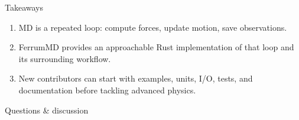 \documentclass[aspectratio=169]{beamer}
\begin{document}
\begin{frame}{Takeaways}
\begin{enumerate}
  \item MD is a repeated loop: compute forces, update motion, save observations.
  \item FerrumMD provides an approachable Rust implementation of that loop and its surrounding workflow.
  \item New contributors can start with examples, units, I/O, tests, and documentation before tackling advanced physics.
\end{enumerate}
\vspace{0.8em}
\centering
\large Questions \& discussion
\end{frame}
\end{document}
